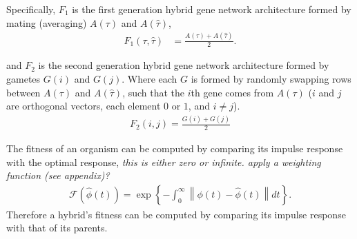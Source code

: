 \documentclass[9 pt]{article}
\newcommand{\plr}[1]{{\color{blue}\it #1}}
\newcommand{\1}{\mathbbm{1}}
\begin{document}
      Specifically, $F_{1}$ is the first generation hybrid gene network architecture formed by mating (averaging) $A(\tau)$ and $A(\hat{\tau})$, 
      \begin{align}
        F_{1}(\tau, \hat{\tau}) &= \frac{ A(\tau) + A(\hat{\tau}) }{2}  .
      \end{align}

      and $F_{2}$ is the second generation hybrid gene network architecture formed by gametes $G(i)$ and $G(j)$. Where each $G$ is formed by randomly swapping rows between $A(\tau)$ and $A(\hat{\tau})$, such that the $i$th  gene comes from $A(\tau)$ ($i$ and $j$ are orthogonal vectors, each element $0$ or $1$, and $i \neq j$).
      \begin{align}
        F_{2}(i, j) = \frac{G (i) + G(j)}{2}
      \end{align}


      The fitness of an organism can be computed by comparing its impulse response with the optimal response,
      \plr{this is either zero or infinite.  apply a weighting function (see appendix)?}
      \begin{align}
        \mathcal{F}\left( \widehat{\phi}(t) \right) = \exp \left\{- \int_{0}^{\infty} \left\lVert \phi(t) - \widehat{\phi}(t) \right\rVert dt \right\}  .
      \end{align}
      Therefore a hybrid's fitness can be computed by comparing its impulse response with that of its parents.
\end{document}
